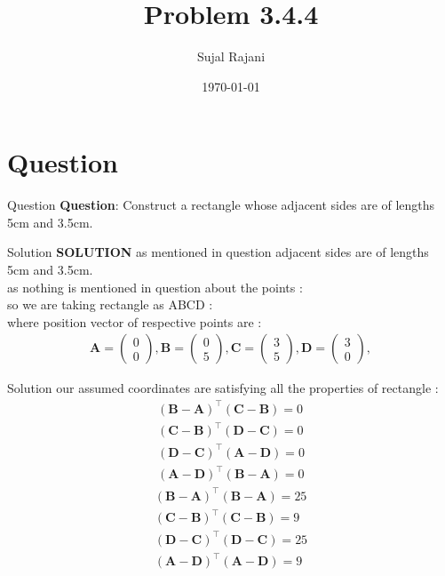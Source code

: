 \documentclass{beamer}
\title{Problem 3.4.4}
\author{Sujal Rajani}
\date{\today}
\let\vec\mathbf
\theoremstyle{remark}
\newcommand{\myvec}[1]{\ensuremath{\begin{pmatrix}#1\end{pmatrix}}}
\numberwithin{equation}{section}
\begin{document}
\begin{frame}
\titlepage
\end{frame}

\section{Question}
\begin{frame}{Question}
\textbf{Question}:
\noindent Construct a rectangle whose adjacent sides are of lengths 5cm and 3.5cm.
\end{frame}
\begin{frame}{Solution}
\textbf{SOLUTION}
 as  mentioned in question adjacent sides are of lengths 5cm and 3.5cm.
 \\
as nothing is mentioned in question about the points :
\\
so we are taking rectangle as ABCD :
\\
 where position vector of respective points are :
 \\
 \begin{align*}
     \vec{A}=\myvec{0\\0}, \vec{B}=\myvec{0\\5}, \vec{C}=\myvec{3\\5},\vec{D}=\myvec{3\\0},
 \end{align*}
 \end{frame}
\begin{frame}{Solution}
 our assumed coordinates are satisfying all the properties of rectangle :
 \begin{align*}
     (\vec{B}-\vec{A})^\top(\vec{C}-\vec{B})=0
     \\
      (\vec{C}-\vec{B})^\top(\vec{D}-\vec{C})=0
      \\
       (\vec{D}-\vec{C})^\top(\vec{A}-\vec{D})=0
        \\
        (\vec{A}-\vec{D})^\top(\vec{B}-\vec{A})=0
 \end{align*}
 \begin{align*}
     (\vec{B}-\vec{A})^\top(\vec{B}-\vec{A})=25
     \\
     (\vec{C}-\vec{B})^\top(\vec{C}-\vec{B})=9
     \\
      (\vec{D}-\vec{C})^\top (\vec{D}-\vec{C})=25
      \\
      (\vec{A}-\vec{D})^\top(\vec{A}-\vec{D})=9
 \end{align*}
     \end{frame}
\end{document}
